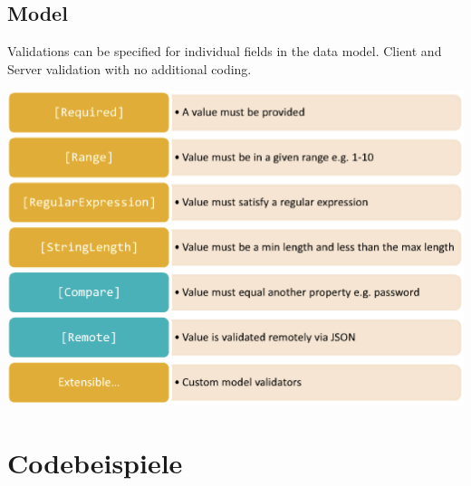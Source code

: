\documentclass[10pt]{article}
\begin{document}
\subsection{Model}
Validations can be specified for individual fields in the data model. Client and Server validation with no additional coding.	
\begin{center}
	\includegraphics[scale=0.2]{mvc_model.png}
\end{center}

\pagebreak
\section{Codebeispiele}
\end{document}
